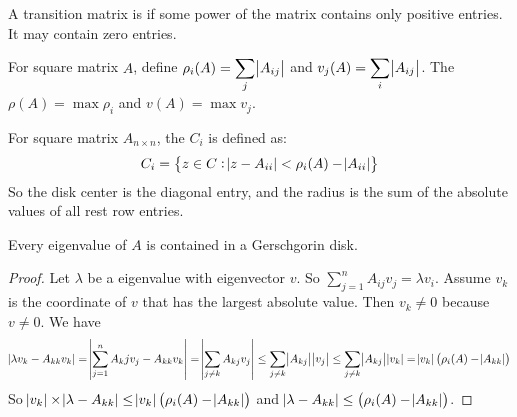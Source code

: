 \begin{definition}
    A transition matrix is  if some power of the matrix contains only positive entries. It may contain zero entries.
\end{definition}

\begin{definition}
    For square matrix $A$, define $\displaystyle \rho_i (A) = \sum_j \abs{A_{ij}}$ and $\displaystyle v_j(A) = \sum_i \abs{A_{ij}}$. The  $\rho (A) = \max \rho_i$ and  $v(A) = \max v_j$.
\end{definition}

\begin{definition}
    For square matrix $A_{n \times n}$, the  $C_i$ is defined as:
    \begin{equation}
        C_i = \set{z \in C: \abs{z - A_{ii}} < \rho_i (A) - \abs{A_{ii}}}
    \end{equation}
    So the disk center is the diagonal entry, and the radius is the sum of the absolute values of all rest row entries.
\end{definition}

\begin{theorem}
    Every eigenvalue of $A$ is contained in a Gerschgorin disk.    
\end{theorem}
\begin{proof}
    Let $\lambda$ be a eigenvalue with eigenvector $v$. So $\displaystyle \sum_{j=1}^n A_{ij} v_j = \lambda v_i$. Assume $v_k$ is the coordinate of $v$ that has the largest absolute value. Then $v_k \neq 0$ because $v \neq 0$. We have
    \begin{equation*}
        \begin{aligned}
            \abs{\lambda v_k - A_{kk} v_k} = \abs{\sum_{j=1}^n A_kj v_j - A_{kk} v_k} = \abs{\sum_{j \neq k} A_{kj} v_j} \leq \sum_{j \neq k} \abs{A_{kj}} \abs{v_j} \leq \sum_{j \neq k} \abs{A_{kj}} \abs{v_k} = \abs{v_k} \left(\rho_i (A) - \abs{A_{kk}} \right)
        \end{aligned}
    \end{equation*}
    So $\abs{v_k} \times \abs{\lambda - A_{kk} } \leq \abs{v_k} \left(\rho_i (A) - \abs{A_{kk}} \right)$ and $\abs{\lambda - A_{kk} } \leq \left(\rho_i (A) - \abs{A_{kk}} \right)$.
\end{proof}

